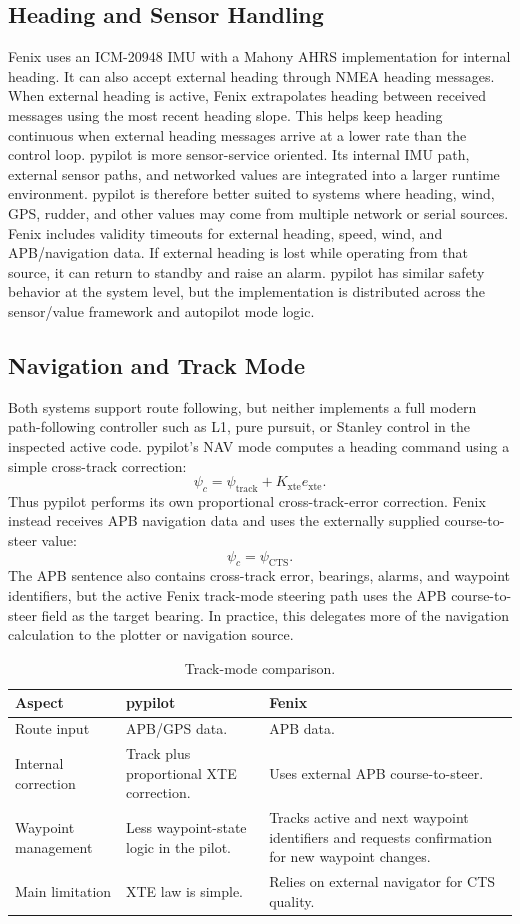 \documentclass[11pt,twocolumn]{article}
\begin{document}
\subsection{Heading and Sensor Handling}
Fenix uses an ICM-20948 IMU with a Mahony AHRS implementation for internal
heading.  It can also accept external heading through NMEA heading
messages.  When external heading is active, Fenix extrapolates heading
between received messages using the most recent heading slope.  This helps
keep heading continuous when external heading messages arrive at a lower
rate than the control loop.
pypilot is more sensor-service oriented.  Its internal IMU path, external
sensor paths, and networked values are integrated into a larger runtime
environment.  pypilot is therefore better suited to systems where heading,
wind, GPS, rudder, and other values may come from multiple network or
serial sources.
Fenix includes validity timeouts for external heading, speed, wind, and
APB/navigation data.  If external heading is lost while operating from
that source, it can return to standby and raise an alarm.  pypilot has
similar safety behavior at the system level, but the implementation is
distributed across the sensor/value framework and autopilot mode logic.
\subsection{Navigation and Track Mode}
Both systems support route following, but neither implements a full modern
path-following controller such as L1, pure pursuit, or Stanley control in
the inspected active code.
pypilot's NAV mode computes a heading command using a simple cross-track
correction:
\[
\psi_c
=
\psi_{\mathrm{track}}
+
K_{\mathrm{xte}} e_{\mathrm{xte}} .
\]
Thus pypilot performs its own proportional cross-track-error correction.
Fenix instead receives APB navigation data and uses the externally
supplied course-to-steer value:
\[
\psi_c = \psi_{\mathrm{CTS}} .
\]
The APB sentence also contains cross-track error, bearings, alarms, and
waypoint identifiers, but the active Fenix track-mode steering path uses
the APB course-to-steer field as the target bearing.  In practice, this
delegates more of the navigation calculation to the plotter or navigation
source.
\begin{table}[h]
\centering
\caption{Track-mode comparison.}
\label{tab:pypilot-fenix-track}
\begin{tabularx}{\columnwidth}{Z{0.20\columnwidth}YY}
\toprule
Aspect & pypilot & Fenix \\
\midrule
Route input &
APB/GPS data. &
APB data. \\
Internal correction &
Track plus proportional XTE correction. &
Uses external APB course-to-steer. \\
Waypoint management &
Less waypoint-state logic in the pilot. &
Tracks active and next waypoint identifiers and requests confirmation for
new waypoint changes. \\
Main limitation &
XTE law is simple. &
Relies on external navigator for CTS quality. \\
\bottomrule
\end{tabularx}
\end{table}
\end{document}
